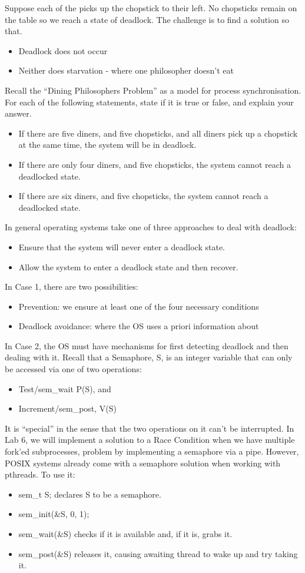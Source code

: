 \documentclass[a4paper, 10pt]{article}
\begin{document}
Suppose each of the picks up the chopstick to their left. No chopsticks remain on the table so we reach a state of deadlock. The challenge is to find a solution so that.
\begin{itemize}
    \item Deadlock does not occur
    \item Neither does starvation - where one philosopher doesn't eat
\end{itemize}
Recall the “Dining Philosophers Problem” as a model for process synchronisation. For each of the following statements, state if it is true or false, and explain your answer.
\begin{itemize}
    \item If there are five diners, and five chopsticks, and all diners pick up a chopstick at the same time, the system will be in deadlock.
    \item If there are only four diners, and five chopsticks, the system cannot reach a deadlocked state.
    \item If there are six diners, and five chopsticks, the system cannot reach a deadlocked state.
\end{itemize}
In general operating systems take one of three approaches to deal with deadlock:
\begin{itemize}
    \item Ensure that the system will never enter a deadlock state.
    \item Allow the system to enter a deadlock state and then recover.
\end{itemize}
In Case 1, there are two possibilities:
\begin{itemize}
    \item Prevention: we ensure at least one of the four necessary conditions
    \item Deadlock avoidance: where the OS uses a priori information about
\end{itemize}
In Case 2, the OS must have mechanisms for first detecting deadlock and then dealing with it.
Recall that a Semaphore, S, is an integer variable that can only be accessed via one of two operations:
\begin{itemize}
    \item Test/sem\_wait P(S), and
    \item Increment/sem\_post, V(S)
\end{itemize}
It is “special” in the sense that the two operations on it can't be interrupted.
In Lab 6, we will implement a solution to a Race Condition when we have multiple fork'ed subprocesses, problem by implementing a semaphore via a pipe. However, POSIX systems already come with a semaphore solution when working with pthreads. To use it:
\begin{itemize}
    \item sem\_t S; declares S to be a semaphore.
    \item sem\_init(\&S, 0, 1);
    \item sem\_wait(\&S) checks if it is available and, if it is, grabs it.
    \item sem\_post(\&S) releases it, causing awaiting thread to wake up and try taking it.
\end{itemize}
\end{document}
